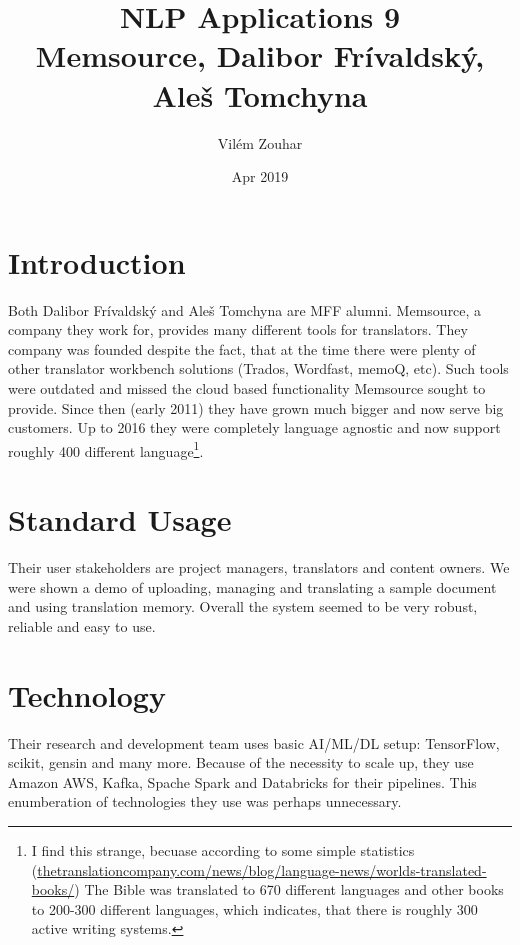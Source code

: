 \documentclass[a4paper]{article}
\begin{document}
\title{NLP Applications 9\\Memsource, Dalibor Frívaldský, Aleš Tomchyna}
\author{Vilém Zouhar}
\date{Apr 2019}
\maketitle 

\section*{Introduction}

Both Dalibor Frívaldský and Aleš Tomchyna are MFF alumni. Memsource, a company they work for, provides many different tools for translators. They company was founded despite the fact, that at the time there were plenty of other translator workbench solutions (Trados, Wordfast, memoQ, etc). Such tools were outdated and missed the cloud based functionality Memsource sought to provide. Since then (early 2011) they have grown much bigger and now serve big customers. Up to 2016 they were completely language agnostic and now support roughly 400 different language\footnote{I find this strange, becuase according to some simple statistics (\href{https://thetranslationcompany.com/news/blog/language-news/worlds-translated-books/}{thetranslationcompany.com/news/blog/language-news/worlds-translated-books/}) The Bible was translated to 670 different languages and other books to 200-300 different languages, which indicates, that there is roughly 300 active writing systems.}.

\section*{Standard Usage}

Their user stakeholders are project managers, translators and content owners. We were shown a demo of uploading, managing and translating a sample document and using translation memory. Overall the system seemed to be very robust, reliable and easy to use.

\section*{Technology}

Their research and development team uses basic AI/ML/DL setup: TensorFlow, scikit, gensin and many more. Because of the necessity to scale up, they use Amazon AWS, Kafka, Spache Spark and Databricks for their pipelines. This enumberation of technologies they use was perhaps unnecessary.
\end{document}
